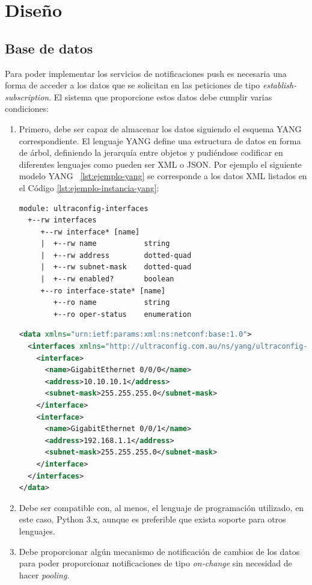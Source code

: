 \chapter{Diseño\label{sec:disenho}}

\section{Base de datos}
Para poder implementar los servicios de notificaciones push es necesaria una forma de acceder a los datos que se solicitan en las peticiones de tipo \textit{establish-subscription}. El sistema que proporcione estos datos debe cumplir varias condiciones:

\begin{enumerate}
\item Primero, debe ser capaz de almacenar los datos siguiendo el esquema YANG correspondiente. El lenguaje YANG define una estructura de datos en forma de árbol, definiendo la jerarquía entre objetos y pudiéndose codificar en diferentes lenguajes como pueden ser \gls{XML} o \gls{JSON}. Por ejemplo el siguiente modelo YANG ~\ref{lst:ejemplo-yang} se corresponde a los datos XML listados en el Código \ref{lst:ejemplo-instancia-yang}:

\begin{lstlisting}[label={lst:ejemplo-yang}, frame=single,caption=Ejemplo de modelo YANG]
module: ultraconfig-interfaces
  +--rw interfaces
     +--rw interface* [name]
     |  +--rw name           string
     |  +--rw address        dotted-quad
     |  +--rw subnet-mask    dotted-quad
     |  +--rw enabled?       boolean
     +--ro interface-state* [name]
        +--ro name           string
        +--ro oper-status    enumeration
\end{lstlisting}

\begin{lstlisting}[label={lst:ejemplo-instancia-yang}, language=XML, frame=single,caption=Una posible instancia del modelo YANG anterior]
<data xmlns="urn:ietf:params:xml:ns:netconf:base:1.0">
  <interfaces xmlns="http://ultraconfig.com.au/ns/yang/ultraconfig-interfaces">
    <interface>
      <name>GigabitEthernet 0/0/0</name>
      <address>10.10.10.1</address>
      <subnet-mask>255.255.255.0</subnet-mask>
    </interface>
    <interface>
      <name>GigabitEthernet 0/0/1</name>
      <address>192.168.1.1</address>
      <subnet-mask>255.255.255.0</subnet-mask>
    </interface>
  </interfaces>
</data>
\end{lstlisting}

\item Debe ser compatible con, al menos, el lenguaje de programación utilizado, en este caso, Python 3.x, aunque es preferible que exista soporte para otros lenguajes.
\item Debe proporcionar algún mecanismo de notificación de cambios de los datos para poder proporcionar notificaciones de tipo \textit{on-change} sin necesidad de hacer \textit{pooling}.
\end{enumerate}


